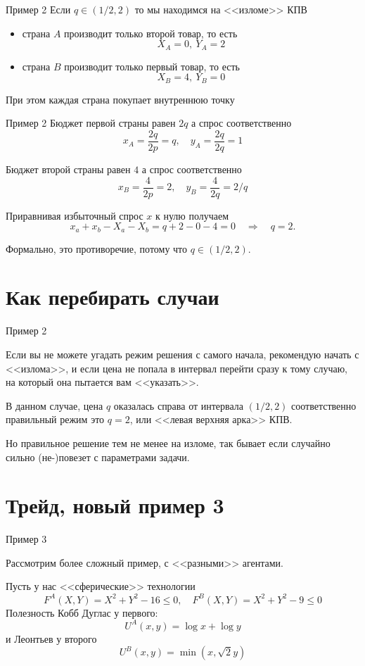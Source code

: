 \documentclass{beamer}
\begin{document}
\begin{frame}{Пример 2}
Если $q \in (1/2,2)$ то мы находимся на <<изломе>> КПВ
\begin{itemize}
  \item страна $A$ производит только второй товар, то есть
 $$X_A = 0, \ Y_A = 2$$
  \item страна $B$ производит только первый товар, то есть
 $$X_B = 4, \ Y_B = 0$$
\end{itemize}
При этом каждая страна покупает внутреннюю точку
\end{frame}

\begin{frame}{Пример 2}
Бюджет первой страны равен $2q$ а спрос соответственно
$$x_A = \frac{2q}{2p} = q, \quad y_A = \frac{2q}{2q} = 1 $$

Бюджет второй страны равен $4$ а спрос соответственно
$$x_B = \frac{4}{2p} = 2, \quad y_B = \frac{4}{2q} = 2/q $$

Приравнивая избыточный спрос $x$ к нулю получаем 
$$x_a + x_b - X_a - X_b = q + 2 - 0 - 4 = 0 \quad \Rightarrow \quad q = 2.$$

Формально, это противоречие, потому что $q \in (1/2,2)$.

\end{frame}

\section{Как перебирать случаи}

\begin{frame}{Пример 2}

Если вы не можете угадать режим решения с самого начала, рекомендую начать с <<излома>>, и если цена не попала в интервал перейти сразу к тому случаю, на который она пытается вам <<указать>>.

В данном случае, цена $q$ оказалась справа от интервала $(1/2,2)$ соответственно правильный режим это $q = 2$, или <<левая верхняя арка>> КПВ.

Но правильное решение тем не менее на изломе, так бывает если случайно сильно (не-)повезет с параметрами задачи.
\end{frame}

\section{Трейд, новый пример 3}

\begin{frame}{Пример 3}

Рассмотрим более сложный пример, с <<разными>> агентами.

Пусть у нас <<сферические>> технологии
$$ F^A(X,Y) = X^2 + Y^2 - 16 \leqslant 0, \quad F^B(X,Y) = X^2 + Y^2 - 9 \leqslant 0$$
Полезность Кобб Дуглас у первого: $$U^A(x,y) = \log x + \log y$$
и Леонтьев у второго $$U^B(x,y) = \min(x, \sqrt{2} y)$$
\end{frame}
\end{document}
